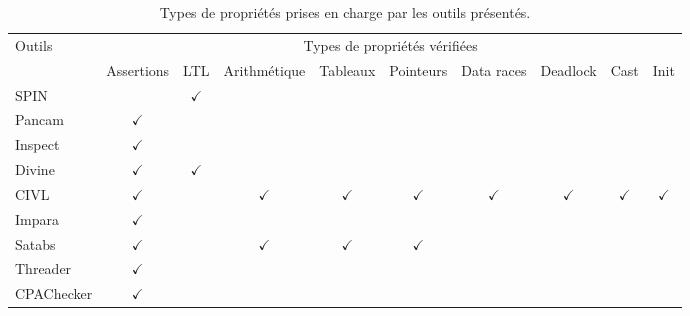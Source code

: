 
\begin{landscape}
\begin{table}[ht]
\centering
\caption{Types de propriétés prises en charge par les outils présentés.}
\begin{tabular}{|l|c|c|c|c|c|c|c|c|c|}
\hline
Outils     & \multicolumn{9}{c|}{Types de propriétés vérifiées}                                                                                     \\
           & Assertions   &      LTL     & Arithmétique &     Tableaux & Pointeurs    & Data races   & Deadlock     & Cast         & Init           \\ \hline
SPIN       &              & $\checkmark$ &              &              &              &              &              &              &                \\
Pancam     & $\checkmark$ &              &              &              &              &              &              &              &                \\
Inspect    & $\checkmark$ &              &              &              &              &              &              &              &                \\
Divine     & $\checkmark$ & $\checkmark$ &              &              &              &              &              &              &                \\
CIVL       & $\checkmark$ &              & $\checkmark$ & $\checkmark$ & $\checkmark$ & $\checkmark$ & $\checkmark$ & $\checkmark$ & $\checkmark$   \\
Impara     & $\checkmark$ &              &              &              &              &              &              &              &                \\
Satabs     & $\checkmark$ &              & $\checkmark$ & $\checkmark$ & $\checkmark$ &              &              &              &                \\
Threader   & $\checkmark$ &              &              &              &              &              &              &              &                \\
CPAChecker & $\checkmark$ &              &              &              &              &              &              &              &                \\

\end{tabular}
\end{table}
\end{landscape}

